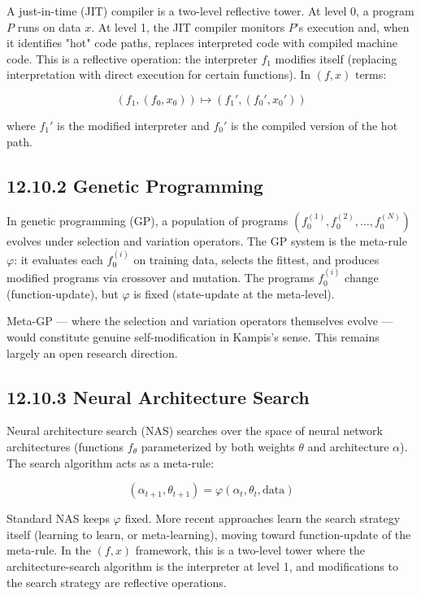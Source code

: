 A just-in-time (JIT) compiler is a two-level reflective tower. At level 0, a program $P$ runs on data $x$. At level 1, the JIT compiler monitors $P$'s execution and, when it identifies "hot" code paths, replaces interpreted code with compiled machine code. This is a reflective operation: the interpreter $f_1$ modifies itself (replacing interpretation with direct execution for certain functions). In $(f, x)$ terms:

\[(f_1, (f_0, x_0)) \longmapsto (f_1', (f_0', x_0'))\]

where $f_1'$ is the modified interpreter and $f_0'$ is the compiled version of the hot path.

\subsection{12.10.2 Genetic Programming}

In genetic programming (GP), a population of programs $(f_0^{(1)}, f_0^{(2)}, \ldots, f_0^{(N)})$ evolves under selection and variation operators. The GP system is the meta-rule $\varphi$: it evaluates each $f_0^{(i)}$ on training data, selects the fittest, and produces modified programs via crossover and mutation. The programs $f_0^{(i)}$ change (function-update), but $\varphi$ is fixed (state-update at the meta-level).

Meta-GP --- where the selection and variation operators themselves evolve --- would constitute genuine self-modification in Kampis's sense. This remains largely an open research direction.

\subsection{12.10.3 Neural Architecture Search}

Neural architecture search (NAS) searches over the space of neural network architectures (functions $f_\theta$ parameterized by both weights $\theta$ and architecture $\alpha$). The search algorithm acts as a meta-rule:

\[(\alpha_{t+1}, \theta_{t+1}) = \varphi(\alpha_t, \theta_t, \text{data})\]

Standard NAS keeps $\varphi$ fixed. More recent approaches learn the search strategy itself (learning to learn, or meta-learning), moving toward function-update of the meta-rule. In the $(f, x)$ framework, this is a two-level tower where the architecture-search algorithm is the interpreter at level 1, and modifications to the search strategy are reflective operations.

